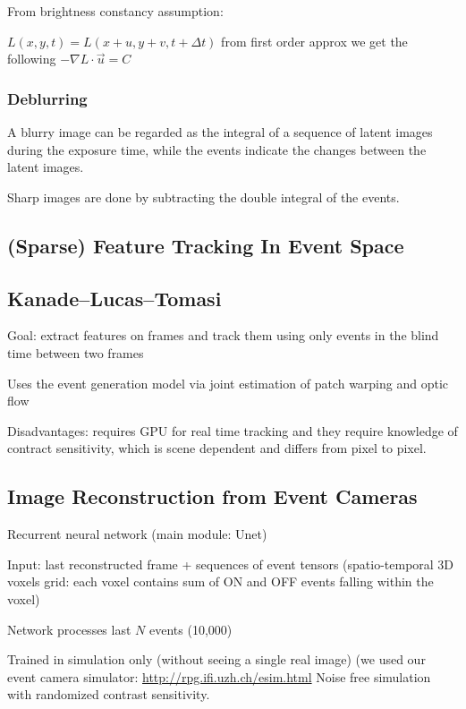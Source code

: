 From brightness constancy assumption:

$L(x,y,t) = L(x+u,y+v,t+\Delta t)$ from first order approx we get the following $-\nabla L \cdot \vec u = C$

\subsubsection{Deblurring}

A blurry image can be regarded as the integral of a sequence of latent images during the exposure time, while the events indicate the changes between the latent images.

Sharp images are done by subtracting the double integral of the events.

\subsection{(Sparse) Feature Tracking In Event Space}

\subsection{Kanade–Lucas–Tomasi}

Goal: extract features on frames and track them using only events in the blind time between two frames

Uses the event generation model via joint estimation of patch warping and optic flow

Disadvantages: requires GPU for real time tracking and they require knowledge of contract sensitivity, which is scene dependent and differs from pixel to pixel.	

\subsection{Image Reconstruction from Event Cameras}

Recurrent neural network (main module: Unet) 

Input: last reconstructed frame + sequences of event tensors (spatio-temporal 3D voxels grid: each voxel contains sum of ON and OFF events falling within the voxel)

Network processes last $N$ events (10,000) 

Trained in simulation only (without seeing a single real image) (we used our event camera simulator: \url{http://rpg.ifi.uzh.ch/esim.html} Noise free simulation with randomized contrast sensitivity.
